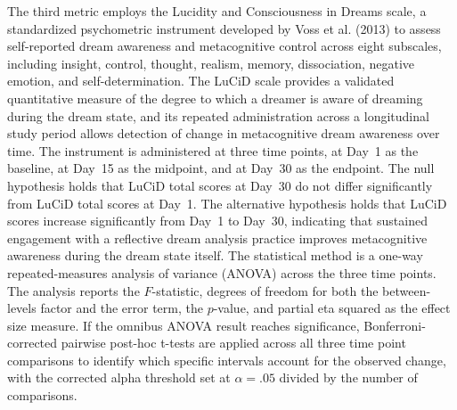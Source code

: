 \documentclass[12pt,a4paper]{report}
\begin{document}
The third metric employs the Lucidity and Consciousness in Dreams scale, a standardized psychometric instrument developed by Voss et al. (2013) to assess self-reported dream awareness and metacognitive control across eight subscales, including insight, control, thought, realism, memory, dissociation, negative emotion, and self-determination. The LuCiD scale provides a validated quantitative measure of the degree to which a dreamer is aware of dreaming during the dream state, and its repeated administration across a longitudinal study period allows detection of change in metacognitive dream awareness over time. The instrument is administered at three time points, at Day~\num{1} as the baseline, at Day~\num{15} as the midpoint, and at Day~\num{30} as the endpoint. The null hypothesis holds that LuCiD total scores at Day~\num{30} do not differ significantly from LuCiD total scores at Day~\num{1}. The alternative hypothesis holds that LuCiD scores increase significantly from Day~\num{1} to Day~\num{30}, indicating that sustained engagement with a reflective dream analysis practice improves metacognitive awareness during the dream state itself. The statistical method is a one-way repeated-measures analysis of variance (ANOVA) across the three time points. The analysis reports the $F$-statistic, degrees of freedom for both the between-levels factor and the error term, the $p$-value, and partial eta squared as the effect size measure. If the omnibus ANOVA result reaches significance, Bonferroni-corrected pairwise post-hoc t-tests are applied across all three time point comparisons to identify which specific intervals account for the observed change, with the corrected alpha threshold set at $\alpha = .05$ divided by the number of comparisons.
\end{document}

